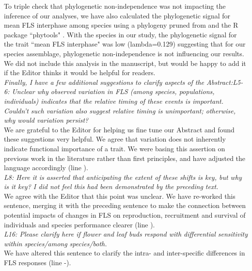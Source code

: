\documentclass[11pt]{article}
\begin{document}
\noindent To triple check that phylogenetic non-independence was not impacting the inference of our analyses, we have also calculated the phylogenetic signal for mean FLS interphase among species using a phylogeny pruned from \citet{Zanne2013} and the R package ``phytools" \citep{Revell2012}. With the species in our study, the phylogenetic signal for the trait ``mean FLS interphase" was low (lambda=0.129) suggesting that for our species assemblage, phylogenetic non-independence is not influencing our results. We did not include this analysis in the manuscript, but would be happy to add it if the Editor thinks it would be helpful for readers.\\

\emph{Finally, I have a few additional suggestions to clarify aspects of the Abstract:L5-6: Unclear why observed variation in FLS (among species, populations, individuals) indicates that the relative timing of these events is important. Couldn't such variation also suggest relative timing is unimportant; otherwise, why would variation persist?}\\

\noident We are grateful to the Editor for helping us fine tune our Abstract and found these suggestions very helpful. We agree that variation does not inherently indicate functional importance of a trait. We were basing this assertion on previous work in the literature rather than first principles, and have adjusted the language accordingly (line ).\\ 

\emph{L8: Here it is asserted that anticipating the extent of these shifts is key, but why is it key? I did not feel this had been demonstrated by the preceding text.}\\

\noindent We agree with the Editor that this point was unclear. We have re-worked this sentence, merging it with the preceding sentence to make the connection between potential impacts of changes in FLS on reproduction, recruitment and survival of individuals and species performance clearer (line ).\\

\emph{L16: Please clarify here if flower and leaf buds respond with differential sensitivity within species/among species/both.}\\

\noindent We have altered this sentence to clarify the intra- and inter-specific differences in FLS responses (line -).
\end{document}
